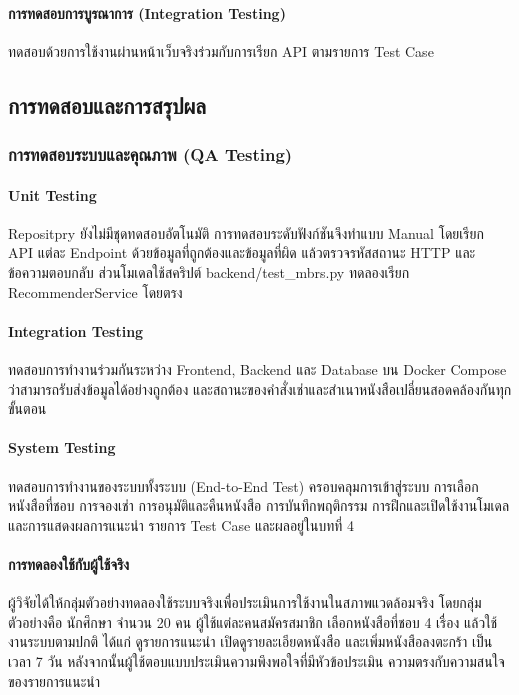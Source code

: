 \paragraph{การทดสอบการบูรณาการ (Integration Testing)}
ทดสอบด้วยการใช้งานผ่านหน้าเว็บจริงร่วมกับการเรียก API ตามรายการ Test Case 

\subsection{การทดสอบและการสรุปผล}

\subsubsection{การทดสอบระบบและคุณภาพ (QA Testing)}

\paragraph{Unit Testing}
Repositpry ยังไม่มีชุดทดสอบอัตโนมัติ การทดสอบระดับฟังก์ชันจึงทำแบบ Manual โดยเรียก API แต่ละ Endpoint ด้วยข้อมูลที่ถูกต้องและข้อมูลที่ผิด แล้วตรวจรหัสสถานะ HTTP และข้อความตอบกลับ ส่วนโมเดลใช้สคริปต์ backend/test\_mbrs.py ทดลองเรียก RecommenderService โดยตรง

\paragraph{Integration Testing}
ทดสอบการทำงานร่วมกันระหว่าง Frontend, Backend และ Database บน Docker Compose ว่าสามารถรับส่งข้อมูลได้อย่างถูกต้อง และสถานะของคำสั่งเช่าและสำเนาหนังสือเปลี่ยนสอดคล้องกันทุกขั้นตอน

\paragraph{System Testing}
ทดสอบการทำงานของระบบทั้งระบบ (End-to-End Test) ครอบคลุมการเข้าสู่ระบบ การเลือกหนังสือที่ชอบ การจองเช่า การอนุมัติและคืนหนังสือ การบันทึกพฤติกรรม การฝึกและเปิดใช้งานโมเดล และการแสดงผลการแนะนำ รายการ Test Case และผลอยู่ในบทที่ 4

\paragraph{การทดลองใช้กับผู้ใช้จริง}
ผู้วิจัยได้ให้กลุ่มตัวอย่างทดลองใช้ระบบจริงเพื่อประเมินการใช้งานในสภาพแวดล้อมจริง โดยกลุ่มตัวอย่างคือ นักศึกษา จำนวน 20 คน ผู้ใช้แต่ละคนสมัครสมาชิก เลือกหนังสือที่ชอบ 4 เรื่อง แล้วใช้งานระบบตามปกติ ได้แก่ ดูรายการแนะนำ เปิดดูรายละเอียดหนังสือ และเพิ่มหนังสือลงตะกร้า เป็นเวลา 7 วัน หลังจากนั้นผู้ใช้ตอบแบบประเมินความพึงพอใจที่มีหัวข้อประเมิน ความตรงกับความสนใจของรายการแนะนำ 

